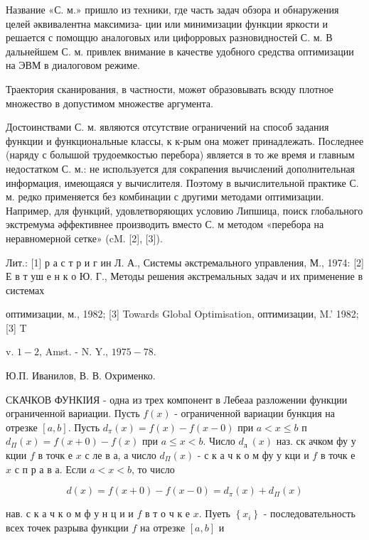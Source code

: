 \documentclass[10pt]{article}
\begin{document}
Название «С. м.» пришло из техники, где часть задач обзора и обнаружения целей әквивалентна максимиза- ции или минимизации функции яркости и решается с помощцю аналоговых или цифорровых разновидностей С. м. В дальнейшем С. м. привлек внимание в качестве удобного средства оптимизации на ЭВМ в диалоговом режиме.



Траектория сканирования, в частности, можөт образовывать всюду плотное множество в допустимом множестве аргумента.



Достоинствами С. м. являются отсутствие ограничений на способ задания функции и функциональные классы, к к-рым она может принадлежать. Последнее (наряду с болышой трудоемкостью перебора) является в то же время и главным недостатком С. м.: не используется для сокрапения вычислений дополнительная информация, имеющаяся у вычислителя. Поэтому в вычислительной практике С. м. редко применяется без комбинации с другими методами оптимизации. Например, для функций, удовлетворяющих условию Липшица, поиск глобального экстремума әффективнее производить вместо С. м методом «перебора на неравномерной сетке» (cM. [2], [3]).



Лит.: [1] р а с т р и г ин Л. А., Системы әкстремального управления, М., 1974: [2] Е в т уш е н к о Ю. Г., Методы решения әкстремальных задач и их применение в системах

оптимизации, м., 1982; [3] Towards Global Optimisation, оптимизации, M.' 1982; [3] T

v. $1-2$, Amst. - N. Y., $1975-78$.



Ю.П. Иванилов, В. В. Охрименко.



СКАЧКОВ ФУНКІИЯ - одна из трех компонент в Лебеаа разложении функции ограниченной вариации. Пусть $f(x)$ - ограниченной вариации бункция на отрезке $[a, b]$. Пусть $d_{\pi}(x)=f(x)-f(x-0)$ при $a<x \leqslant b$ п $d_{\Pi}(x)=f(x+0)-f(x)$ при $a \leqslant x<b$. Число $d_{\text {л }}(x)$ наз. ск ачком фу у кции $f$ в точк е $x$ с ле в а, а число $d_{\Pi}(x)$ - с к а ч к о м фу у кци и $f$ в точк е $x$ с п р а в а. Если $a<x<b$, то число



\[

d(x)=f(x+0)-f(x-0)=d_{\pi}(x)+d_{\Pi}(x)

\]



нав. с к а ч к о м ф у н ц и и $f$ в т о ч к е $x$. Пуеть $\left\{x_{i}\right\}$ - последовательность всех точек разрыва функции $f$ на отрезке $[a, b]$ и
\end{document}
